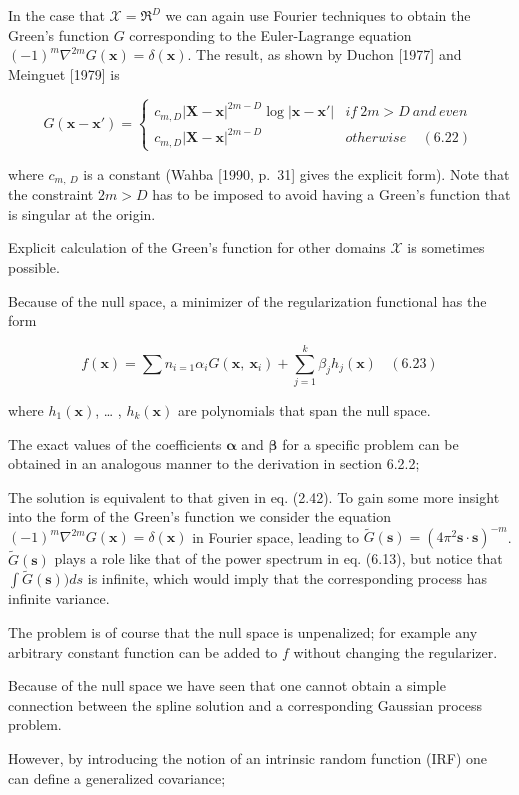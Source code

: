 \documentclass[
  ignorenonframetext,
]{beamer}
\begin{document}
\begin{frame}{}
\protect\hypertarget{section-16}{}
In the case that \(\mathcal X = \mathfrak R^D\) we can again use Fourier
techniques to obtain the Green's function \(G\) corresponding to the
Euler-Lagrange equation
\((−1)^m \nabla^{2m} G(\pmb x) = \delta (\pmb x)\). The result, as shown
by Duchon {[}1977{]} and Meinguet {[}1979{]} is

\[
G(\pmb x− \pmb x') = 
\begin{cases}
c_{m,D}  |\pmb X - \pmb x|^{2m−D} \log |\pmb x −  \pmb x'| 
&  if\ 2m>D\ and\ even\\
c_{m,D}  |\pmb X - \pmb x|^{2m−D} & otherwise \ \ \ \ \ (6.22)
\end{cases}
\]

where \(c_{m,\ D}\) is a constant (Wahba {[}1990, p.~31{]} gives the
explicit form). Note that the constraint \(2m > D\) has to be imposed to
avoid having a Green's function that is singular at the origin.

Explicit calculation of the Green's function for other domains
\(\mathcal X\) is sometimes possible.
\end{frame}

\begin{frame}{}
\protect\hypertarget{section-17}{}
Because of the null space, a minimizer of the regularization functional
has the form

\[
f(\pmb x) = \sum n_{i=1} \alpha_iG(\pmb x,\ \pmb x_i) + \sum^k_{j=1}
\beta_j h_j(\pmb x) \ \ \ \ (6.23)
\]

where \(h_1(\pmb x)\), \ldots{} , \(h_k(\pmb x)\) are polynomials that
span the null space.

The exact values of the coefficients \(\pmb \alpha\) and \(\pmb\beta\)
for a specific problem can be obtained in an analogous manner to the
derivation in section 6.2.2;

The solution is equivalent to that given in eq. (2.42). To gain some
more insight into the form of the Green's function we consider the
equation \((−1)^m \nabla^{2m} G(\pmb x) = \delta (\pmb x)\) in Fourier
space, leading to
\(\tilde G(\pmb s) = (4\pi^2 \pmb s \cdot \pmb s)^{−m}\).
\(\tilde G(\pmb s)\) plays a role like that of the power spectrum in eq.
(6.13), but notice that \(\int \tilde G (\pmb s))ds\) is infinite, which
would imply that the corresponding process has infinite variance.
\end{frame}

\begin{frame}{}
\protect\hypertarget{section-18}{}
The problem is of course that the null space is unpenalized; for example
any arbitrary constant function can be added to \(f\) without changing
the regularizer.

Because of the null space we have seen that one cannot obtain a simple
connection between the spline solution and a corresponding Gaussian
process problem.

However, by introducing the notion of an intrinsic random function (IRF)
one can define a generalized covariance;
\end{frame}
\end{document}
